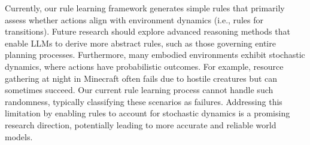 \documentclass{article} %
\begin{document}
Currently, our rule learning framework generates simple rules that primarily assess whether actions align with environment dynamics (i.e., rules for transitions). Future research should explore advanced reasoning methods that enable LLMs to derive more abstract rules, such as those governing entire planning processes.
Furthermore, many embodied environments exhibit stochastic dynamics, where actions have probabilistic outcomes. For example, resource gathering at night in Minecraft often fails due to hostile creatures but can sometimes succeed. Our current rule learning process cannot handle such randomness, typically classifying these scenarios as failures. Addressing this limitation by enabling rules to account for stochastic dynamics is a promising research direction, potentially leading to more accurate and reliable world models.




















\end{document}
